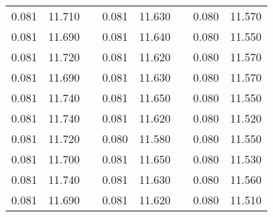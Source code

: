 \documentclass[12pt]{mwrep}
\begin{document}
\begin{table}[H]
\begin{tabularx}{\textwidth}{|Y|Y|p{2mm}|Y|Y|p{2mm}|Y|Y|}
			0.081 & 11.710 && 0.081 & 11.630 && 0.080 & 11.570 \\
			0.081 & 11.690 && 0.081 & 11.640 && 0.080 & 11.550 \\
			0.081 & 11.720 && 0.081 & 11.620 && 0.080 & 11.570 \\
			0.081 & 11.690 && 0.081 & 11.630 && 0.080 & 11.570 \\
			0.081 & 11.740 && 0.081 & 11.650 && 0.080 & 11.550 \\
			0.081 & 11.740 && 0.081 & 11.620 && 0.080 & 11.520 \\
			0.081 & 11.720 && 0.080 & 11.580 && 0.080 & 11.550 \\
			0.081 & 11.700 && 0.081 & 11.650 && 0.080 & 11.530 \\
			0.081 & 11.740 && 0.081 & 11.630 && 0.080 & 11.560 \\
			0.081 & 11.690 && 0.081 & 11.620 && 0.080 & 11.510 \\
		\end{tabularx}
	\end{table}
	
\end{document}
